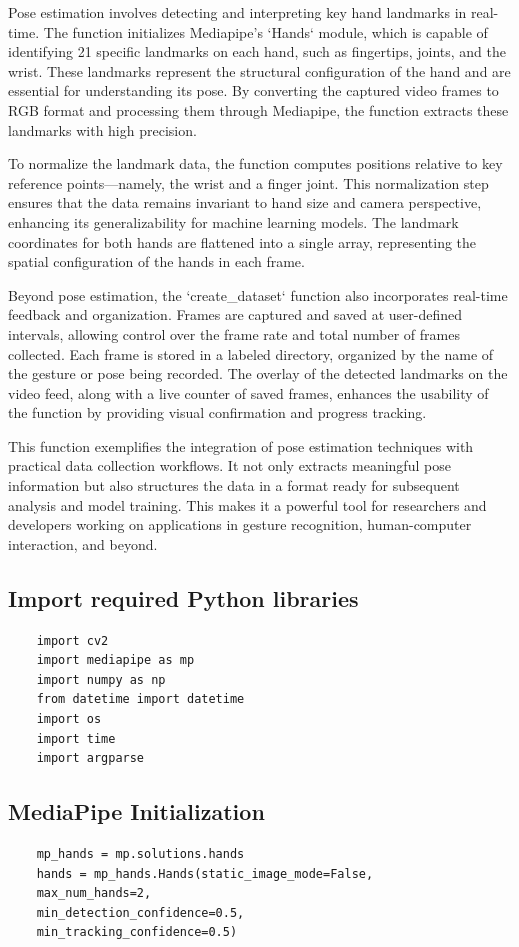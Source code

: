 Pose estimation involves detecting and interpreting key hand landmarks in real-time. The function initializes Mediapipe's `Hands` module, which is capable of identifying 21 specific landmarks on each hand, such as fingertips, joints, and the wrist. These landmarks represent the structural configuration of the hand and are essential for understanding its pose. By converting the captured video frames to RGB format and processing them through Mediapipe, the function extracts these landmarks with high precision.

To normalize the landmark data, the function computes positions relative to key reference points—namely, the wrist and a finger joint. This normalization step ensures that the data remains invariant to hand size and camera perspective, enhancing its generalizability for machine learning models. The landmark coordinates for both hands are flattened into a single array, representing the spatial configuration of the hands in each frame.

Beyond pose estimation, the `create\_dataset` function also incorporates real-time feedback and organization. Frames are captured and saved at user-defined intervals, allowing control over the frame rate and total number of frames collected. Each frame is stored in a labeled directory, organized by the name of the gesture or pose being recorded. The overlay of the detected landmarks on the video feed, along with a live counter of saved frames, enhances the usability of the function by providing visual confirmation and progress tracking.

This function exemplifies the integration of pose estimation techniques with practical data collection workflows. It not only extracts meaningful pose information but also structures the data in a format ready for subsequent analysis and model training. This makes it a powerful tool for researchers and developers working on applications in gesture recognition, human-computer interaction, and beyond.

\subsection{Import required Python libraries}
\begin{lstlisting}
	import cv2
	import mediapipe as mp
	import numpy as np
	from datetime import datetime
	import os
	import time
	import argparse
\end{lstlisting}

\subsection{MediaPipe Initialization}
\begin{lstlisting}
	mp_hands = mp.solutions.hands
	hands = mp_hands.Hands(static_image_mode=False,
	max_num_hands=2,
	min_detection_confidence=0.5,
	min_tracking_confidence=0.5)
	
\end{lstlisting}

